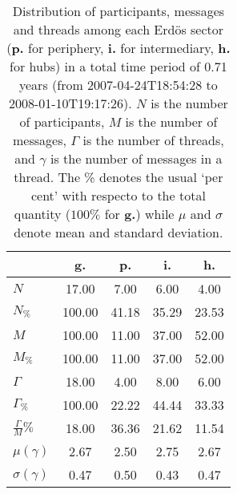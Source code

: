 \begin{table}[h!]
\begin{center}
\begin{tabular}{| l | c | c | c | c |}\hline
 & g. & p. & i. & h. \\\hline
$N$ & 17.00  & 7.00  & 6.00  & 4.00 \\\hline
$N_{\%}$ & 100.00  & 41.18  & 35.29  & 23.53 \\\hline
$M$ & 100.00  & 11.00  & 37.00  & 52.00 \\\hline
$M_{\%}$ & 100.00  & 11.00  & 37.00  & 52.00 \\\hline
$\Gamma$ & 18.00  & 4.00  & 8.00  & 6.00 \\\hline
$\Gamma_{\%}$ & 100.00  & 22.22  & 44.44  & 33.33 \\\hline
$\frac{\Gamma}{M}\%$ & 18.00  & 36.36  & 21.62  & 11.54 \\\hline
$\mu(\gamma)$ & 2.67  & 2.50  & 2.75  & 2.67 \\\hline
$\sigma(\gamma)$ & 0.47  & 0.50  & 0.43  & 0.47 \\\hline
\end{tabular}
\caption{Distribution of participants, messages and threads among each Erd\"os sector ({\bf p.} for periphery, {\bf i.} for intermediary, 
    {\bf h.} for hubs) in a total time period of 0.71 years (from 2007-04-24T18:54:28 to 2008-01-10T19:17:26). $N$ is the number of participants, $M$ is the number of messages, $\Gamma$ is the number of threads, and $\gamma$ is the number of messages in a thread.
    The \% denotes the usual `per cent' with respecto to the total quantity ($100\%$ for {\bf g.})
    while $\mu$ and $\sigma$ denote mean and standard deviation.}
\end{center}
\end{table}